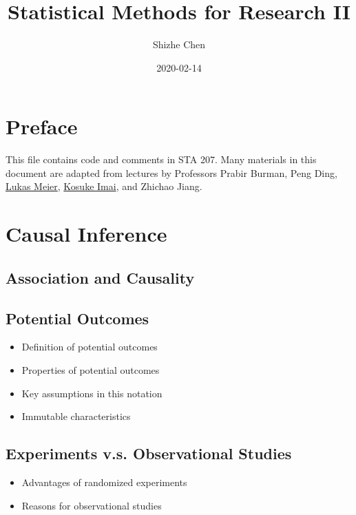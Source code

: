 \documentclass[12pt,]{book}
\title{Statistical Methods for Research II}
\author{Shizhe Chen}
\date{2020-02-14}
\providecommand{\tightlist}{%
  \setlength{\itemsep}{0pt}\setlength{\parskip}{0pt}}
\begin{document}
\maketitle

{
\setcounter{tocdepth}{1}
\tableofcontents
}
\chapter*{Preface}\label{pre}

This file contains code and comments in STA 207. Many materials in this
document are adapted from lectures by Professors Prabir Burman, Peng
Ding, \href{https://stat.ethz.ch/~meier/teaching/anova/}{Lukas Meier},
\href{https://imai.fas.harvard.edu/teaching/index.html}{Kosuke Imai},
and Zhichao Jiang.

\chapter{Causal Inference}\label{ch:causal}

\section{Association and Causality}\label{association-and-causality}

\section{Potential Outcomes}\label{potential-outcomes}

\begin{itemize}
\tightlist
\item
  Definition of potential outcomes
\item
  Properties of potential outcomes
\item
  Key assumptions in this notation
\item
  Immutable characteristics
\end{itemize}

\section{Experiments v.s. Observational
Studies}\label{experiments-v.s.-observational-studies}

\begin{itemize}
\tightlist
\item
  Advantages of randomized experiments
\item
  Reasons for observational studies
\end{itemize}
\end{document}
